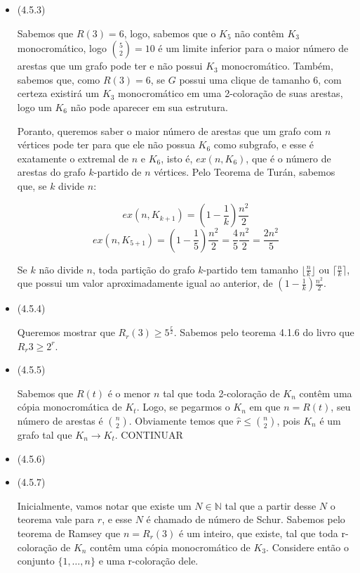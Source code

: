 \documentclass{article}
\begin{document}
\begin{itemize}
\begin{itemize}
	      \end{itemize}
	\item (4.5.3)

	      Sabemos que \(R(3) = 6\), logo, sabemos que o \(K_5\) não contêm \(K_3\) monocromático, logo \(\binom{5}{2} = 10\) é um limite inferior para o maior número de arestas que um grafo
	      pode ter e não possui \(K_3\) monocromático. Também, sabemos que, como \(R(3) = 6\), se \(G\) possui uma clique de tamanho 6, com certeza existirá um \(K_3\) monocromático em uma 2-coloração
	      de suas arestas, logo um \(K_6\) não pode aparecer em sua estrutura.

	      Poranto, queremos saber o maior número de arestas que um grafo com \(n\) vértices pode ter para que ele não possua \(K_6\) como subgrafo, e esse é exatamente o extremal de \(n\) e \(K_6\), isto é, \(ex(n, K_6)\), que é o número de arestas do grafo
	      \(k\)-partido de \(n\) vértices.
	      Pelo Teorema de Turán, sabemos que, se \(k\) divide \(n\):

	      \[ex(n, K_{k+1}) = (1 - \frac{1}{k})\frac{n^2}{2}\]
	      \[ex(n, K_{5+1}) = (1 - \frac{1}{5})\frac{n^2}{2} = \frac{4}{5}\frac{n^2}{2} = \frac{2n^2}{5}\]

	      Se \(k\) não divide \(n\), toda partição do grafo \(k\)-partido tem tamanho \(\lfloor \frac{n}{k} \rfloor\) ou \(\lceil \frac{n}{k} \rceil\), que possui um valor aproximadamente igual ao anterior, de \((1 - \frac{1}{k})\frac{n^2}{2}\).


	\item (4.5.4)

	      Queremos mostrar que \(R_r(3) \geq 5^{\frac{r}{2}}\). Sabemos pelo teorema 4.1.6 do livro que \(R_r{3} \geq 2^r\).
	\item (4.5.5)

	      Sabemos que \(R(t)\) é o menor \(n\) tal que toda 2-coloração de \(K_n\) contêm uma cópia monocromática de \(K_t\). Logo, se pegarmos o \(K_n\) em que \(n = R(t)\), seu número de arestas é \(\binom{n}{2}\). Obviamente temos que
	      \(\hat{r} \leq \binom{n}{2}\), pois \(K_n\) é um grafo tal que \(K_n \rightarrow K_t\). CONTINUAR

	\item (4.5.6)
	\item (4.5.7)

	      Inicialmente, vamos notar que existe um \(N \in \mathbb{N}\) tal que a partir desse \(N\) o teorema vale para \(r\), e esse \(N\) é chamado de número de
	      Schur. Sabemos pelo teorema de Ramsey que \(n = R_r(3)\) é um inteiro, que existe, tal que
	      toda r-coloração de \(K_n\) contêm uma cópia monocromático de \(K_3\).
	      Considere então o conjunto \(\{1, \dots, n\}\) e uma r-coloração dele.


\end{itemize}
\end{document}

